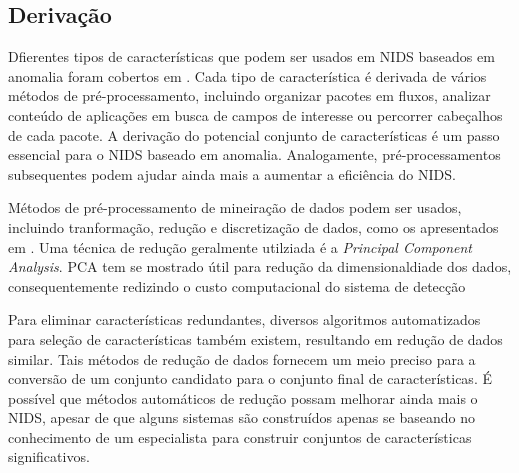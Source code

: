 \subsection{Derivação}
Dfierentes tipos de características que podem ser usados em NIDS baseados em anomalia foram cobertos em \cite{davis11}.
Cada tipo de característica é derivada de vários métodos de pré-processamento, incluindo organizar pacotes em fluxos,
analizar conteúdo de aplicações em busca de campos de interesse ou percorrer cabeçalhos de cada pacote. A derivação do
potencial conjunto de características é um passo essencial para o NIDS baseado em anomalia. Analogamente,
pré-processamentos subsequentes podem ajudar ainda mais a aumentar a eficiência do NIDS.
\par Métodos de pré-processamento de mineiração de dados podem ser usados, incluindo tranformação, redução e
discretização de dados, como os apresentados em \cite{ribeiro08}. Uma técnica de redução geralmente utilziada é a
\textit{Principal Component Analysis}. PCA tem se mostrado útil para redução da dimensionaldiade dos dados,
consequentemente redizindo o custo computacional do sistema de detecção
\par Para eliminar características redundantes, diversos algoritmos automatizados para seleção de características
também existem, resultando em redução de dados similar. Tais métodos de redução de dados fornecem um meio preciso para
a conversão de um conjunto candidato para o conjunto final de características. É possível que métodos automáticos de
redução possam melhorar ainda mais o NIDS, apesar de que alguns sistemas são construídos apenas se baseando no
conhecimento de um especialista para construir conjuntos de características significativos.

